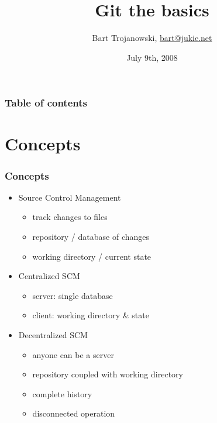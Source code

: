\documentclass[english]{beamer}
\title{Git the basics}
\author{Bart Trojanowski, \href{mailto:bart@jukie.net}{bart@jukie.net}}
\institute{Jukie Networks Inc.}
\date{July 9th, 2008}
\newcommand{\mysection}[2]{
  \hypertarget{#2}{}
  \section{#1}
  \label{#2}
}
\begin{document}
\label{header}\hypertarget{header}{}
\frame{\maketitle}

\begin{frame}
        \frametitle{Table of contents}
        \par\noindent
        \tableofcontents
\end{frame}

\mysection{Concepts}{_concepts}
\begin{frame}
\frametitle{Concepts}
\begin{itemize}
        \item Source Control Management
                \begin{itemize}
                        \item track changes to files
                        \item repository / database of changes
                        \item working directory / current state
                \end{itemize}

        \pause{}
        \item Centralized SCM
                \begin{itemize}
                        \item server: single database
                        \item client: working directory \&{} state
                \end{itemize}

        \pause{}
        \item Decentralized SCM
                \begin{itemize}
                        \item anyone can be a server
                        \item repository coupled with working directory
                        \item complete history
                        \item disconnected operation
                \end{itemize}
\end{itemize}

\end{frame}
\end{document}

